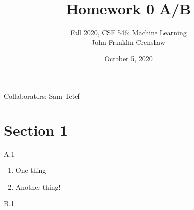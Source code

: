 \documentclass{article}
\date{\normalsize{October 5, 2020}}
\begin{document}
\title{Homework 0 A/B}
\author{\normalsize{Fall 2020, CSE 546: Machine Learning} \\ 
        \normalsize{John Franklin Crenshaw}}
\maketitle

Collaborators: Sam Tetef

\section*{Section 1}

A.1
\begin{enumerate}
        \item One thing
        \item Another thing!
\end{enumerate}


B.1
\end{document}

